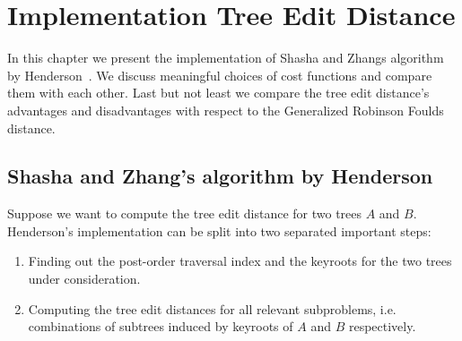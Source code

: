 \chapter{Implementation Tree Edit Distance}
In this chapter we present the implementation of Shasha and Zhangs algorithm by Henderson~\cite{Hen}. We discuss meaningful choices of cost functions and compare them with each other. Last but not least we compare the tree edit distance's advantages and disadvantages with respect to the Generalized Robinson Foulds distance. 

\section{Shasha and Zhang's algorithm by Henderson}
Suppose we want to compute the tree edit distance for two trees $A$ and $B$. Henderson's implementation can be split into two separated important steps:
\begin{enumerate}
\item Finding out the post-order traversal index and the keyroots for the two trees under consideration.
\item Computing the tree edit distances for all relevant subproblems, i.e. combinations of subtrees induced by keyroots of $A$ and $B$ respectively.
\end{enumerate}

